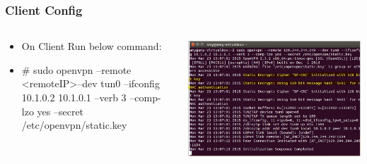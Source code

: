 \documentclass{beamer}
\begin{document}
\begin{frame}
\frametitle{Client Config}
\begin{columns}
    \begin{column}{0.48\textwidth}
        \begin{itemize}
	\item On Client Run below command:\\
	\item \# sudo openvpn {\color{red}{--proto tcp-client}} --remote \textless remoteIP\textgreater  --dev tun0 --ifconfig 10.1.0.2 10.1.0.1 --verb 3 --comp-lzo yes --secret /etc/openvpn/static.key
        \end{itemize}
    \end{column}
    \begin{column}{.5\textwidth}
        \includegraphics[width=.9\linewidth]{am2}
    \end{column}
\end{columns}
\end{frame}
\end{document}
